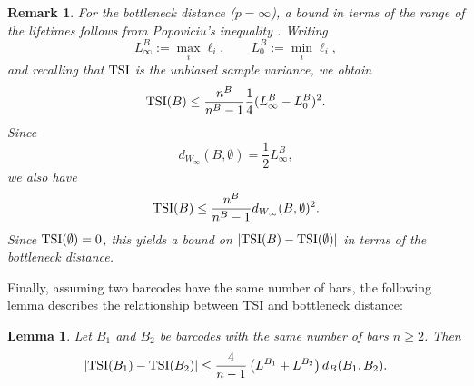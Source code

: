 \documentclass[11pt]{amsart}
\newtheorem*{remark}{Remark}
\newtheorem{lemma}[theorem]{Lemma}
\theoremstyle{definition}
\newcommand{\tsi}[0]{\textup{TSI}}
\begin{document}
\begin{remark}\rm
For the bottleneck distance ($p=\infty$), a bound in terms of the range of the lifetimes follows from Popoviciu's inequality
\cite{bhatia_better_2000}. Writing
\[
L_\infty^B:=\max_i \ell_i,
\qquad
L_0^B:=\min_i \ell_i,
\]
and recalling that \(\tsi\) is the unbiased sample variance, we obtain
\[
\tsi(B)\leq
\frac{n^B}{n^B-1}\frac{1}{4}(L_\infty^B-L_0^B)^2.
\]
Since
\[
d_{W_\infty}(B,\emptyset)=\frac12 L_\infty^B,
\]
we also have
\[
\tsi(B)\leq
\frac{n^B}{n^B-1}d_{W_\infty}(B,\emptyset)^2.
\]
Since \(\tsi(\emptyset)=0\), this yields a bound on
\(|\tsi(B)-\tsi(\emptyset)|\) in terms of the bottleneck distance.
\end{remark}



Finally, assuming two barcodes have the same number of bars, the following lemma describes the relationship between TSI and bottleneck distance:

\begin{lemma}
Let $B_1$ and $B_2$ be barcodes with the same number of bars $n\geq 2$. Then
\begin{equation}
|\tsi(B_1)-\tsi(B_2)|
\leq \frac{4}{n-1}\left(L^{B_1}+L^{B_2}\right)d_B(B_1,B_2).
\end{equation}
\end{lemma}
\end{document}
